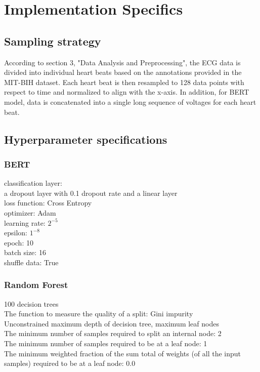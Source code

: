 \section{Implementation Specifics}
\subsection{Sampling strategy}
According to section 3, "Data Analysis and Preprocessing", the ECG data is divided into individual heart beats based on the annotations provided in the MIT-BIH dataset. Each heart beat is then resampled to 128 data points with respect to time and normalized to align with the x-axis. In addition, for BERT model, data is concatenated into a single long sequence of voltages for each heart beat. 

\subsection{Hyperparameter specifications}
\subsubsection{BERT}
classification layer: \\
a dropout layer with 0.1 dropout rate and a linear layer \\
loss function: Cross Entropy \\
optimizer: Adam \\
learning rate: $2^{-5}$ \\
epsilon: $1^{-8}$\\
epoch: 10 \\
batch size: 16 \\ 
shuffle data: True 

\subsubsection{Random Forest}
100 decision trees \\
The function to measure the quality of a split: Gini impurity \\
Unconstrained maximum depth of decision tree, maximum leaf nodes \\
The minimum number of samples required to split an internal node: 2 \\
The minimum number of samples required to be at a leaf node: 1 \\
The minimum weighted fraction of the sum total of weights (of all the input samples) required to be at a leaf node: 0.0

